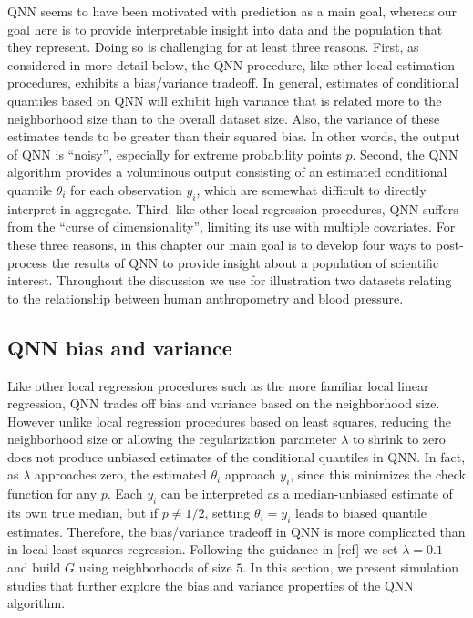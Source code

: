 QNN seems to have been motivated with prediction as a main goal,
whereas our goal here is to provide interpretable insight into data
and the population that they represent.  Doing so is challenging for
at least three reasons.  First, as considered in more detail below,
the QNN procedure, like other local estimation procedures, exhibits a
bias/variance tradeoff.  In general, estimates of conditional
quantiles based on QNN will exhibit high variance that is related more
to the neighborhood size than to the overall dataset size.  Also, the
variance of these estimates tends to be greater than their squared
bias.  In other words, the output of QNN is ``noisy'', especially for
extreme probability points $p$.  Second, the QNN algorithm provides a
voluminous output consisting of an estimated conditional quantile
$\theta_i$ for each observation $y_i$, which are somewhat difficult to
directly interpret in aggregate.  Third, like other local regression
procedures, QNN suffers from the ``curse of dimensionality'', limiting
its use with multiple covariates.  For these three reasons, in this
chapter our main goal is to develop four ways to post-process the
results of QNN to provide insight about a population of scientific
interest.  Throughout the discussion we use for illustration two
datasets relating to the relationship between human anthropometry and
blood pressure.

\subsection{QNN bias and variance}

Like other local regression procedures such as the more familiar local
linear regression, QNN trades off bias and variance based on the
neighborhood size.  However unlike local regression procedures based
on least squares, reducing the neighborhood size or allowing the
regularization parameter $\lambda$ to shrink to zero does not produce
unbiased estimates of the conditional quantiles in QNN.  In fact, as
$\lambda$ approaches zero, the estimated $\theta_i$ approach $y_i$,
since this minimizes the check function for any $p$.  Each $y_i$ can
be interpreted as a median-unbiased estimate of its own true median,
but if $p\ne 1/2$, setting $\theta_i = y_i$ leads to biased quantile
estimates.  Therefore, the bias/variance tradeoff in QNN is more
complicated than in local least squares regression.  Following the
guidance in [ref] we set $\lambda=0.1$ and build $G$ using
neighborhoods of size $5$.  In this section, we present simulation
studies that further explore the bias and variance properties of the
QNN algorithm.

